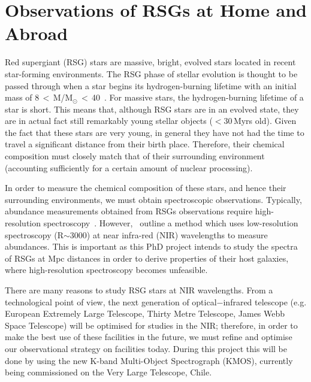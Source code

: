 
\section{Observations of RSGs at Home and Abroad} %
\label{sec:rsg_observations}



Red supergiant (RSG) stars are massive, bright, evolved stars located in recent star-forming environments.
The RSG phase of stellar evolution is thought to be passed through when a star begins its hydrogen-burning lifetime with an initial mass of 8\,$<$\,M/M$_{\odot}\,<$\,40~\citep{Massey03, Crowther07, Meynet11}.
For massive stars, the hydrogen-burning lifetime of a star is short.
This means that, although RSG stars are in an evolved state, they are in actual fact still remarkably young stellar objects ($<$30\,Myrs old).
Given the fact that these stars are very young, in general they have not had the time to travel a significant distance from their birth place.
Therefore, their chemical composition must closely match that of their surrounding environment (accounting sufficiently for a certain amount of nuclear processing).


In order to measure the chemical composition of these stars, and hence their surrounding environments, we must obtain spectroscopic observations.
Typically, abundance measurements obtained from RSGs observations require high-resolution spectroscopy~\citep[R$\ge$ 20\,000;][]{Cunha07, Davies09a, Davies09b}.
However,~\cite{2010MNRAS.407.1203D} outline a method which uses low-resolution spectroscopy (R$\sim$3000) at near infra-red (NIR) wavelengths to measure abundances.
This is important as this PhD project intends to study the spectra of RSGs at Mpc distances in order to derive properties of their host galaxies, where high-resolution spectroscopy becomes unfeasible.


There are many reasons to study RSG stars at NIR wavelengths.
From a technological point of view, the next generation of optical$-$infrared telescope (e.g. European Extremely Large Telescope, Thirty Metre Telescope, James Webb Space Telescope) will be optimised for studies in the NIR; therefore, in order to make the best use of these facilities in the future, we must refine and optimise our observational strategy on facilities today.
During this project this will be done by using the new K-band Multi-Object Spectrograph (KMOS), currently being commissioned on the Very Large Telescope, Chile.


